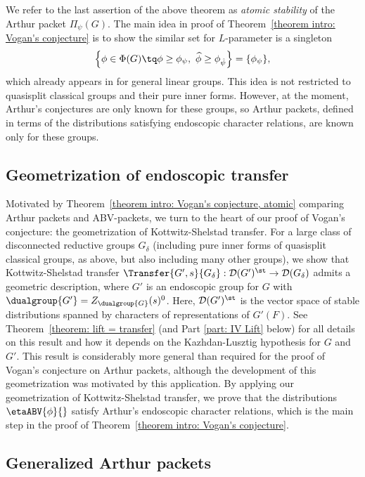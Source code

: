 \documentclass[11pt,letterpaper]{amsart}
\numberwithin{equation}{section}
\begin{document}
We refer to the last assertion of the above theorem as  {\it atomic stability} of the Arthur packet $\Pi_{\psi}(G)$. 
The main idea in proof of Theorem~\ref{theorem intro: Vogan's conjecture} is to show the similar set for $L$-parameter is a singleton
\[
\left\{ \phi \in \Phi(G) \tq \phi \geq \phi_\psi,\ \widehat{\phi} \geq \phi_{\hat \psi}
\right\}=\{\phi_{\psi}\},
\]
 which already appears in \cite{Lo24} for general linear groups. This idea is not restricted to quasisplit classical groups and their pure inner forms.
However, at the moment, Arthur's conjectures are only known for these groups, so Arthur packets, defined in terms of the distributions satisfying endoscopic character relations, are known only for these groups. 


\subsection{Geometrization of endoscopic transfer}

Motivated by Theorem~\ref{theorem intro: Vogan's conjecture, atomic} comparing Arthur packets and ABV-packets, we turn to the heart of  our proof of Vogan's conjecture: the geometrization of Kottwitz-Shelstad transfer. 
For a large class of disconnected reductive groups $G_\delta$ (including pure inner forms of quasisplit classical groups, as above, but also including many other groups), we show that Kottwitz-Shelstad transfer $\Transfer{G',s}{G_\delta} : \mathcal{D}(G')^\st \to \mathcal{D}(G_\delta)$ admits a geometric description, where $G'$ is an endoscopic group for $G$ with $\dualgroup{G'} = Z_{\dualgroup{G}}(s)^0$. 
    Here, $\mathcal{D}(G')^\st$ is the vector space of stable distributions spanned by characters of representations of $G'(F)$.
    See Theorem~\ref{theorem: lift = transfer} (and Part \ref{part: IV Lift} below) for all details on this result and how it depends on the Kazhdan-Lusztig hypothesis for $G$ and $G'$.
This result is considerably more general than required for the proof of Vogan's conjecture on Arthur packets, although the development of this geometrization was motivated by this application.
By applying our geometrization of Kottwitz-Shelstad transfer, we prove that the distributions $\etaABV{\phi}{}$ satisfy Arthur's endoscopic character relations, which is the main step in the proof of Theorem~\ref{theorem intro: Vogan's conjecture}.

\subsection{Generalized Arthur packets}
\end{document}
